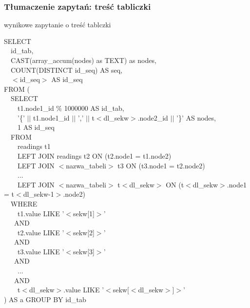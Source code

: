 \begin{frame}
 \frametitle{Tłumaczenie zapytań: treść tabliczki}

% 
% 

 \begin{block}{wynikowe zapytanie o treść tablczki}
\begin{scriptsize}
SELECT \\
~~id\_tab, \\
~~CAST(array\_accum(nodes) as TEXT) as nodes,\\
~~COUNT(DISTINCT id\_seq) AS seq,\\
~~$<$id\_seq$>$ AS id\_seq\\
FROM (\\
~~SELECT\\
~~~~t1.node1\_id \% 1000000 AS id\_tab,\\
~~~~’\{’ $||$ t1.node1\_id $||$ ’,’ $||$ t$<$dl\_sekw$>$.node2\_id $||$ ’\}’ AS nodes,\\
~~~~1 AS id\_seq\\
~~FROM\\
~~~~readings t1\\
~~~~LEFT JOIN readings t2 ON (t2.node1 = t1.node2)\\
~~~~LEFT JOIN $<$nazwa\_tabeli$>$ t3 ON (t3.node1 = t2.node2)\\
~~~~...\\
~~~~LEFT JOIN $<$nazwa\_tabeli$>$ t$<$dl\_sekw$>$ ON (t$<$dl\_sekw$>$.node1 = t$<$dl\_sekw-1$>$.node2)\\
~~WHERE\\
~~~~t1.value LIKE ’$<$sekw[1]$>$’\\
~~~AND\\
~~~~t2.value LIKE ’$<$sekw[2]$>$’\\
~~~AND\\
~~~~t3.value LIKE ’$<$sekw[3]$>$’\\
~~~AND\\
~~~~...\\
~~~AND\\
~~~~t$<$dl\_sekw$>$.value LIKE ’$<$sekw[$<$dl\_sekw$>$]$>$’\\
) AS a
GROUP BY id\_tab

\end{scriptsize}
 \end{block}


\end{frame}